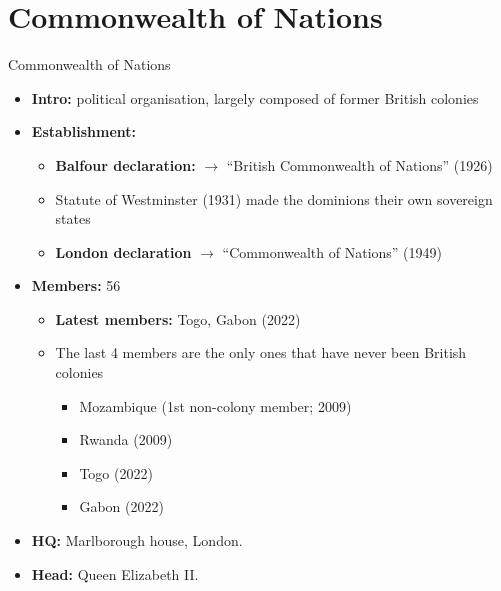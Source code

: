 \documentclass[
  10pt,
  ignorenonframetext,
  progressbar=frametitle]{beamer}
\providecommand{\tightlist}{%
  \setlength{\itemsep}{0pt}\setlength{\parskip}{0pt}}
\begin{document}
\section{Commonwealth of Nations}
\begin{frame}[allowframebreaks]
{Commonwealth of Nations}
\protect\hypertarget{commonwealth-of-nations}{}
\begin{itemize}
\tightlist
\item
  \textbf{Intro:} political organisation, largely composed of former
  British colonies
\item
  \textbf{Establishment:}

  \begin{itemize}
  \tightlist
  \item
    \textbf{Balfour declaration:} \(\rightarrow\) ``British Commonwealth
    of Nations'' (1926)
  \item
    Statute of Westminster (1931) made the dominions their own sovereign
    states
  \item
    \textbf{London declaration} \(\rightarrow\) ``Commonwealth of
    Nations'' (1949)
  \end{itemize}
\item
  \textbf{Members:} 56

  \begin{itemize}
  \tightlist
  \item
    \textbf{Latest members:} Togo, Gabon (2022)
  \item
    The last 4 members are the only ones that have never been British
    colonies

    \begin{itemize}
    \tightlist
    \item
      Mozambique (1st non-colony member; 2009)
    \item
      Rwanda (2009)
    \item
      Togo (2022)
    \item
      Gabon (2022)
    \end{itemize}
  \end{itemize}
\item
  \textbf{HQ:} Marlborough house, London.
\item
  \textbf{Head:} Queen Elizabeth II.
\end{itemize}
\end{frame}
\end{document}
